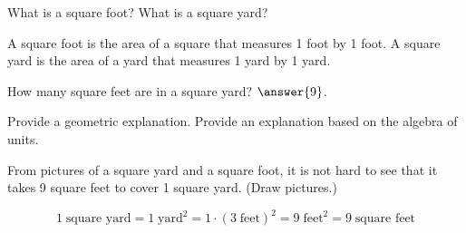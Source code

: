 \documentclass[nooutcomes]{ximera}
\begin{document}
\begin{question}
What is a square foot?  What is a square yard? 
\begin{freeResponse}
\begin{hint}
A square foot is the area of a square that measures 1 foot by 1 foot.  A square yard is the area of a yard that measures 1 yard by 1 yard. 
\end{hint}
\end{freeResponse}
\end{question}

\begin{question}
How many square feet are in a square yard?  $\answer{9}$.  

Provide a geometric explanation. Provide an explanation based on the algebra of units. 
\begin{freeResponse}
\begin{hint}
From pictures of a square yard and a square foot, it is not hard to see that it takes 9 square feet to cover 1 square yard.  (Draw pictures.)
\end{hint}
\begin{hint}
\[
1\;\textrm{square yard} = 1\;\textrm{yard}^2 = 1\cdot(3\;\textrm{feet})^2 = 9\;\textrm{feet}^2 = 9\;\textrm{square feet}
\]
\end{hint}
\end{freeResponse}
\end{question}
\end{document}
